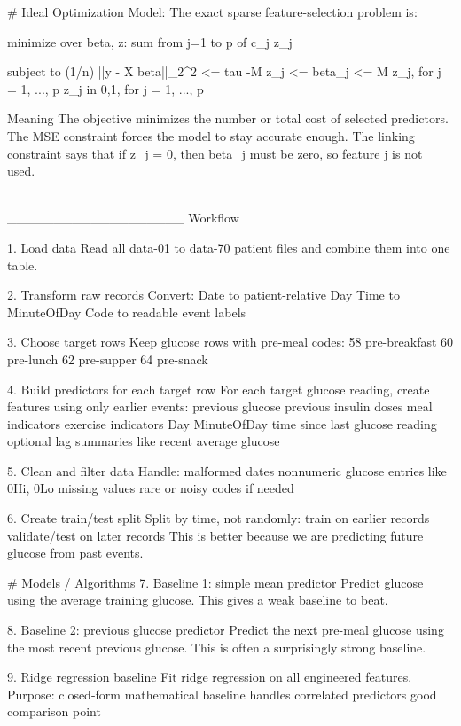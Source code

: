 # Ideal Optimization Model:
The exact sparse feature-selection problem is:

minimize over beta, z:
sum from j=1 to p of c_j z_j

subject to
(1/n) ||y - X beta||_2^2 <= tau
-M z_j <= beta_j <= M z_j,   for j = 1, ..., p
z_j in {0,1},   for j = 1, ..., p

Meaning
The objective minimizes the number or total cost of selected predictors.
The MSE constraint forces the model to stay accurate enough.
The linking constraint says that if z_j = 0, then beta_j must be zero, so feature j is not used.

___________________________________________________________________
Workflow

1. Load data
    Read all data-01 to data-70 patient files and combine them into one table.

2. Transform raw records
Convert:
    Date to patient-relative Day
    Time to MinuteOfDay
    Code to readable event labels

3. Choose target rows
Keep glucose rows with pre-meal codes:
    58 pre-breakfast
    60 pre-lunch
    62 pre-supper
    64 pre-snack

4. Build predictors for each target row
For each target glucose reading, create features using only earlier events:
    previous glucose
    previous insulin doses
    meal indicators
    exercise indicators
    Day
    MinuteOfDay
    time since last glucose reading
    optional lag summaries like recent average glucose

5. Clean and filter data
Handle:
    malformed dates
    nonnumeric glucose entries like 0Hi, 0Lo
    missing values
    rare or noisy codes if needed

6. Create train/test split
Split by time, not randomly:
    train on earlier records
    validate/test on later records
    This is better because we are predicting future glucose from past events.

# Models / Algorithms
7. Baseline 1: simple mean predictor
    Predict glucose using the average training glucose.
    This gives a weak baseline to beat.

8. Baseline 2: previous glucose predictor
    Predict the next pre-meal glucose using the most recent previous glucose.
    This is often a surprisingly strong baseline.

9. Ridge regression baseline
Fit ridge regression on all engineered features.
Purpose:
    closed-form mathematical baseline
    handles correlated predictors
    good comparison point

